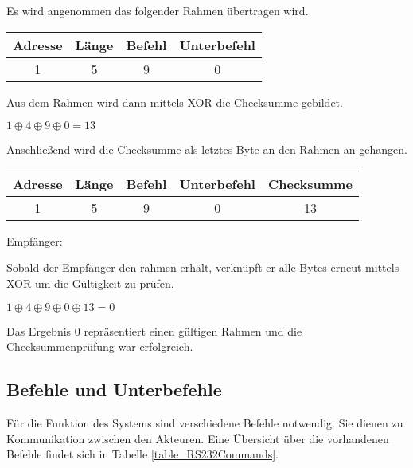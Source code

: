 Es wird angenommen das folgender Rahmen übertragen wird.
\begin{center}
\begin{tabular}{|c|c|c|c|}\hline
  Adresse & Länge & Befehl & Unterbefehl \\ \hline
  1 & 5 & 9 & 0 \\ \hline
\end{tabular}
\end{center}
Aus dem Rahmen wird dann mittels XOR die Checksumme gebildet.

\begin{center}
{\Large$1 \oplus 4 \oplus 9 \oplus 0 = 13$}\\
\end{center}

Anschließend wird die Checksumme als letztes Byte an den Rahmen an gehangen.
\begin{center}
\begin{tabular}{|c|c|c|c|c|}\hline
  Adresse & Länge & Befehl & Unterbefehl & Checksumme \\ \hline
  1 & 5 & 9 & 0 & 13 \\ \hline
\end{tabular}
\end{center}

Empfänger:

Sobald der Empfänger den rahmen erhält, verknüpft er alle Bytes erneut mittels XOR um die Gültigkeit zu prüfen.

\begin{center}
{\Large $1 \oplus 4 \oplus 9 \oplus 0 \oplus 13 = 0$}\\
\end{center}

Das Ergebnis 0 repräsentiert einen gültigen Rahmen und die Checksummenprüfung war erfolgreich.


\subsection{Befehle und Unterbefehle}

Für die Funktion des Systems sind verschiedene Befehle notwendig. Sie dienen zu Kommunikation zwischen den Akteuren.
Eine Übersicht über die vorhandenen Befehle findet sich in Tabelle \ref{table_RS232Commands}.

